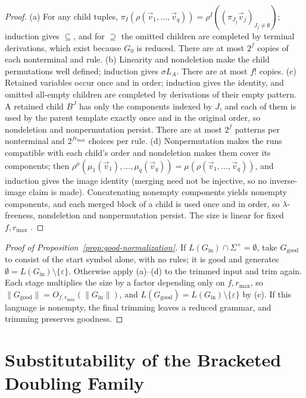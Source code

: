 \documentclass[11pt]{article}
\numberwithin{equation}{section}
\theoremstyle{plain}
\theoremstyle{definition}
\theoremstyle{remark}
\newcommand{\tuple}[1]{\vec{#1}}
\newcommand{\eps}{\varepsilon}
\begin{document}
\begin{proof}
(a) For any child tuples,
$\pi_I(\rho(\tuple v_1,\ldots,\tuple v_q))=\rho^I((\pi_{J_j}\tuple v_j)_{J_j\ne\emptyset})$;
induction gives $\subseteq$, and for $\supseteq$ the omitted children are completed by
terminal derivations, which exist because $G_0$ is reduced.  There are at most $2^f$
copies of each nonterminal and rule.
(b) Linearity and nondeletion make the child permutations well defined; induction gives
$\sigma L_A$.  There are at most $f!$ copies.
(c) Retained variables occur once and in order; induction gives the identity, and
omitted all-empty children are completed by derivations of their empty pattern.  A
retained child $B^J$ has only the components indexed by $J$, and each of them is used by
the parent template exactly once and in the original order, so nondeletion and
nonpermutation persist.  There
are at most $2^f$ patterns per nonterminal and $2^{fr_{\max}}$ choices per rule.
(d) Nonpermutation makes the runs compatible with each child's order and nondeletion
makes them cover its components; then
$\rho^\mu(\mu_1(\tuple v_1),\ldots,\mu_q(\tuple v_q))=\mu(\rho(\tuple v_1,\ldots,\tuple v_q))$,
and induction gives the image identity (merging need not be injective, so no
inverse-image claim is made).  Concatenating nonempty components yields nonempty
components, and each merged block of a child is used once and in order, so
$\lambda$-freeness, nondeletion and nonpermutation persist.  The size is linear for fixed $f,r_{\max}$
\cite[Section~2.3, after Example~2]{Yoshinaka2011}.
\end{proof}

\begin{proof}[Proof of Proposition~\ref{prop:good-normalization}]
If $L(G_{\mathrm{in}})\cap\Sigma^+=\emptyset$, take $G_{\mathrm{good}}$ to consist of the
start symbol alone, with no rules; it is good and generates
$\emptyset=L(G_{\mathrm{in}})\setminus\{\eps\}$.  Otherwise apply (a)--(d) to the trimmed
input and trim again.  Each stage multiplies the size by a
factor depending only on $f,r_{\max}$, so
$\|G_{\mathrm{good}}\|=O_{f,r_{\max}}(\|G_{\mathrm{in}}\|)$, and
$L(G_{\mathrm{good}})=L(G_{\mathrm{in}})\setminus\{\eps\}$ by (c).  If this language is
nonempty, the final trimming leaves a reduced grammar, and trimming preserves goodness.
\end{proof}


\section{Substitutability of the Bracketed Doubling Family}
\label{app:bracketed-family}
\end{document}
